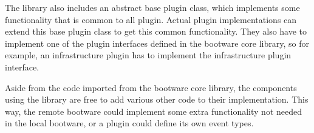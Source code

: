 The library also includes an abstract base plugin class, which implements some functionality that is common to all plugin.
Actual plugin implementations can extend this base plugin class to get this common functionality.
They also have to implement one of the plugin interfaces defined in the bootware core library, so for example, an infrastructure plugin has to implement the infrastructure plugin interface.

Aside from the code imported from the bootware core library, the components using the library are free to add various other code to their implementation.
This way, the remote bootware could implement some extra functionality not needed in the local bootware, or a plugin could define its own event types.
